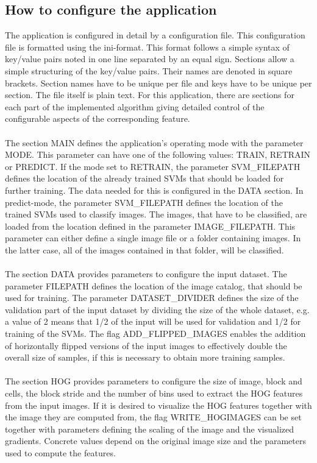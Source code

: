 \subsection{How to configure the application}
The application is configured in detail by a configuration file. This configuration file is formatted using the ini-format. This format follows a simple syntax of key/value pairs noted in one line separated by an equal sign. Sections allow a simple structuring of the key/value pairs. Their names are denoted in square brackets. Section names have to be unique per file and keys have to be unique per section. The file itself is plain text. For this application, there are sections for each part of the implemented algorithm giving detailed control of the configurable aspects of the corresponding feature.
\\
\\
The section MAIN defines the application's operating mode with the parameter MODE. This parameter can have one of the following values: TRAIN, RETRAIN or PREDICT. If the mode set to RETRAIN, the parameter SVM\_FILEPATH defines the location of the already trained SVMs that should be loaded for further training. The data needed for this is configured in the DATA section. In predict-mode, the parameter SVM\_FILEPATH defines the location of the trained SVMs used to classify images. The images, that have to be classified, are loaded from the location defined in the parameter IMAGE\_FILEPATH. This parameter can either define a single image file or a folder containing images. In the latter case, all of the images contained in that folder, will be classified.
\\
\\
The section DATA provides parameters to configure the input dataset. The parameter FILEPATH defines the location of the image catalog, that should be used for training. The parameter DATASET\_DIVIDER defines the size of the validation part of the input dataset by dividing the size of the whole dataset, e.g. a value of 2 means that 1/2 of the input will be used for validation and 1/2 for training of the SVMs. The flag ADD\_FLIPPED\_IMAGES enables the addition of horizontally flipped versions of the input images to effectively double the overall size of samples, if this is necessary to obtain more training samples.
\\
\\
The section HOG provides parameters to configure the size of image, block and cells, the block stride and the number of bins used to extract the HOG features from the input images. If it is desired to visualize the HOG features together with the image they are computed from, the flag WRITE\_HOGIMAGES can be set together with parameters defining the scaling of the image and the visualized gradients. Concrete values depend on the original image size and the parameters used to compute the features.
